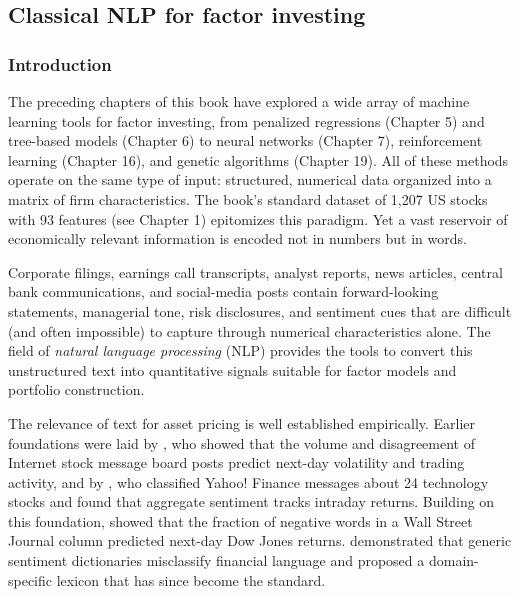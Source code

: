 \subsection{Classical NLP for factor investing}

% 
%

\subsubsection{Introduction}

The preceding chapters of this book have explored a wide array of machine learning tools for factor investing, from penalized regressions (Chapter 5) and tree-based models (Chapter 6) to neural networks (Chapter 7), reinforcement learning (Chapter 16), and genetic algorithms (Chapter 19). All of these methods operate on the same type of input: structured, numerical data organized into a matrix of firm characteristics. The book's standard dataset of 1,207 US stocks with 93 features (see Chapter 1) epitomizes this paradigm. Yet a vast reservoir of economically relevant information is encoded not in numbers but in words.

Corporate filings, earnings call transcripts, analyst reports, news articles, central bank communications, and social-media posts contain forward-looking statements, managerial tone, risk disclosures, and sentiment cues that are difficult (and often impossible) to capture through numerical characteristics alone. The field of \textit{natural language processing} (NLP) provides the tools to convert this unstructured text into quantitative signals suitable for factor models and portfolio construction.

The relevance of text for asset pricing is well established empirically. Earlier foundations were laid by \cite{antweiler2004internet}, who showed that the volume and disagreement of Internet stock message board posts predict next-day volatility and trading activity, and by \cite{das2007yahoo}, who classified Yahoo! Finance messages about 24 technology stocks and found that aggregate sentiment tracks intraday returns. Building on this foundation, \cite{tetlock2007giving} showed that the fraction of negative words in a Wall Street Journal column predicted next-day Dow Jones returns. \cite{loughran2011liability} demonstrated that generic sentiment dictionaries misclassify financial language and proposed a domain-specific lexicon that has since become the standard.

